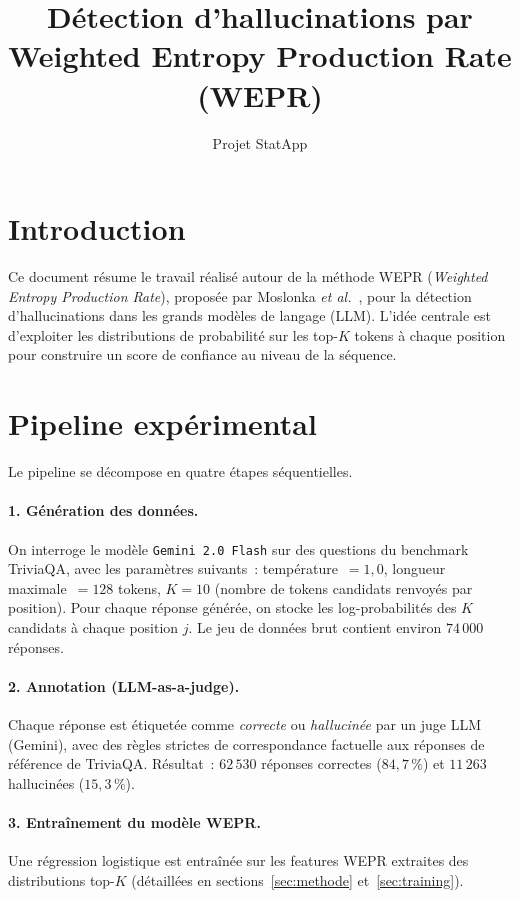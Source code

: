 \documentclass[11pt,a4paper]{article}
\title{Détection d'hallucinations par Weighted Entropy Production Rate (WEPR)}
\author{Projet StatApp}
\date{}
\begin{document}
\maketitle

\section{Introduction}

Ce document résume le travail réalisé autour de la méthode WEPR (\emph{Weighted Entropy Production Rate}), proposée par Moslonka \emph{et al.}~\cite{moslonka2026}, pour la détection d'hallucinations dans les grands modèles de langage (LLM). L'idée centrale est d'exploiter les distributions de probabilité sur les top-$K$ tokens à chaque position pour construire un score de confiance au niveau de la séquence.

\section{Pipeline expérimental}

Le pipeline se décompose en quatre étapes séquentielles.

\paragraph{1. Génération des données.}
On interroge le modèle \texttt{Gemini 2.0 Flash} sur des questions du benchmark TriviaQA, avec les paramètres suivants~: température~$= 1{,}0$, longueur maximale~$= 128$ tokens, $K = 10$ (nombre de tokens candidats renvoyés par position). Pour chaque réponse générée, on stocke les log-probabilités des $K$ candidats à chaque position $j$. Le jeu de données brut contient environ $74\,000$ réponses.

\paragraph{2. Annotation (LLM-as-a-judge).}
Chaque réponse est étiquetée comme \emph{correcte} ou \emph{hallucinée} par un juge LLM (Gemini), avec des règles strictes de correspondance factuelle aux réponses de référence de TriviaQA. Résultat~: $62\,530$ réponses correctes ($84{,}7\,\%$) et $11\,263$ hallucinées ($15{,}3\,\%$).

\paragraph{3. Entraînement du modèle WEPR.}
Une régression logistique est entraînée sur les features WEPR extraites des distributions top-$K$ (détaillées en sections~\ref{sec:methode} et~\ref{sec:training}).
\end{document}
